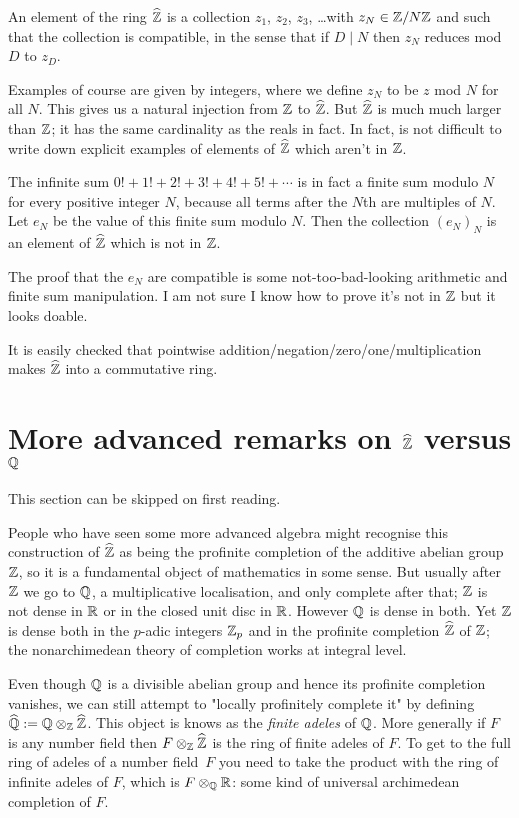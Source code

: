 An element of the ring $\widehat{\mathbb{Z}}$ is a collection $z_1$, $z_2$, $z_3$, \ldots with $z_N\in\mathbb{Z}/N\mathbb{Z}$
and such that the collection is compatible, in the sense that if $D\mid N$ then $z_N$ reduces mod~$D$
to $z_D$.

Examples of course are given by integers, where we define $z_N$ to be $z$ mod $N$ for all $N$. This gives us
a natural injection from $\mathbb{Z}$ to $\widehat{\mathbb{Z}}$. But $\widehat{\mathbb{Z}}$
is much much larger than $\mathbb{Z}$; it has the same cardinality as the reals in fact. In fact, is not difficult to write down explicit examples of elements of $\widehat{\mathbb{Z}}$ which aren't in $\mathbb{Z}$.

\begin{example} The infinite sum $0!+1!+2!+3!+4!+5!+\cdots$ is in fact a finite sum modulo $N$ for every positive integer $N$, because all terms after the $N$th are multiples of $N$.
    Let $e_N$ be the value of this finite sum modulo $N$. Then the collection $(e_N)_N$ is an element of $\widehat{\mathbb{Z}}$ which is not in $\mathbb{Z}$. 
\end{example}
The proof that the $e_N$ are compatible is some not-too-bad-looking arithmetic and finite sum manipulation. I am not sure I
know how to prove it's not in $\mathbb{Z}$ but it looks doable.

It is easily checked that pointwise addition/negation/zero/one/multiplication makes 
$\widehat{\mathbb{Z}}$ into a commutative ring. 

\section{More advanced remarks on $\widehat{\mathbb{Z}}$ versus $\mathbb{Q}$}

This section can be skipped on first reading.

People who have seen some more advanced algebra might recognise this construction of $\widehat{\mathbb{Z}}$
as being the profinite completion of the additive abelian group $\mathbb{Z}$, so it is a fundamental
object of mathematics in some sense. But usually after $\mathbb{Z}$ we go to $\mathbb{Q}$, a multiplicative
localisation, and only complete after that; $\mathbb{Z}$ is not dense in $\mathbb{R}$ or in the closed unit disc in $\mathbb{R}$. However $\mathbb{Q}$ is dense in both. Yet $\mathbb{Z}$ is dense both in the $p$-adic integers $\mathbb{Z}_p$ and in the profinite completion $\widehat{\mathbb{Z}}$ of $\mathbb{Z}$; the nonarchimedean theory of completion works at integral level. 

Even though $\mathbb{Q}$ is a divisible abelian group and hence its profinite completion vanishes,
we can still attempt to "locally profinitely complete it" by defining $\widehat{\mathbb{Q}}:=\mathbb{Q}\otimes_{\mathbb{Z}}\widehat{\mathbb{Z}}$. This object is knows as the \emph{finite adeles} of $\mathbb{Q}$. More generally if $F$ is
any number field then $F\otimes_{\mathbb{Z}}\widehat{\mathbb{Z}}$ is the ring of finite adeles of $F$. To get to
the full ring of adeles of a number field~$F$ you need to take the product with the
ring of infinite adeles of $F$, which is $F\otimes_{\mathbb{Q}}\mathbb{R}$: some kind of universal
archimedean completion of $F$.


